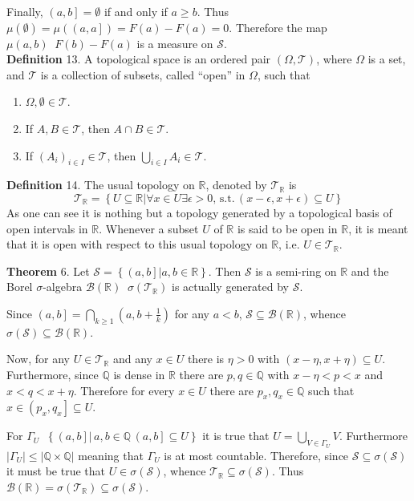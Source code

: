 \documentclass[a4paper]{article}
\newcommand{\obj}[1]{\left\{ #1 \right \}}
\newcommand{\ploc}[1]{\left ( #1 \right ]}
\newcommand{\brac}[1]{\left ( #1 \right )}
\newcommand{\induc}[1]{\left . #1 \right \vert}
\newcommand{\abs}[1]{\left | #1 \right |}
\newcommand{\Real}{\mathbb{R}}
\newcommand{\Tcal}{\mathcal{T}}
\newcommand{\Scal}{\mathcal{S}}
\newcommand{\borel}[1]{\mathcal{B}\brac{#1}}
\newcommand{\defn}{\mathop{\overset{\Delta}{=}}\nolimits}
\begin{document}
Finally, $\ploc{a,b}=\emptyset$ if and only if $a\geq b$. Thus $\mu\brac{\emptyset}=\mu\brac{\ploc{a,a}}=F\brac{a}-F\brac{a}=0$. Therefore the map $\mu\brac{a,b}\defn F\brac{b}-F\brac{a}$ is a measure on $\Scal$.\\

\noindent \textbf{Definition} 13.
A topological space is an ordered pair $\brac{\Omega, \Tcal}$, where $\Omega$ is a set, and $\Tcal$ is a collection of subsets, called ``open'' in $\Omega$, such that \begin{enumerate}
	\item $\Omega, \emptyset \in \Tcal$.
	\item If $A,B\in \Tcal$, then $A\cap B\in \Tcal$.
	\item If $\brac{A_i}_{i\in I}\in \Tcal$, then $\bigcup_{i\in I}A_i \in \Tcal$.
\end{enumerate}

\noindent \textbf{Definition} 14.
The usual topology on $\Real$, denoted by $\Tcal_\Real$ is \[\Tcal_\Real = \obj{\induc{ U\subseteq \Real } \forall x\in U \exists \epsilon > 0,\,\text{s.t.}\,\brac{x-\epsilon,x+\epsilon}\subseteq U}\] As one can see it is nothing but a topology generated by a topological basis of open intervals in $\Real$. Whenever a subset $U$ of $\Real$ is said to be open in $\Real$, it is meant that it is open with respect to this usual topology on $\Real$, i.e. $U\in \Tcal_\Real$.

\label{thm:borel1} \noindent \textbf{Theorem} 6.
Let $\Scal = \obj{\induc{\ploc{a,b}}a,b\in\Real}$. Then $\Scal$ is a semi-ring on $\Real$ and the Borel $\sigma$-algebra $\borel{\Real}\defn\sigma\brac{\Tcal_\Real}$ is actually generated by $\Scal$.

Since $\ploc{a,b}=\bigcap_{k\geq1}\brac{a,b+\frac{1}{k}}$ for any $a<b$, $\Scal\subseteq \borel{\Real}$, whence $\sigma\brac{\Scal}\subseteq \borel{\Real}$.

Now, for any $U\in \Tcal_\Real$ and any $x\in U$ there is $\eta>0$ with $\brac{x-\eta,x+\eta}\subseteq U$. Furthermore, since $\mathbb{Q}$ is dense in $\Real$ there are $p,q\in\mathbb{Q}$ with $x-\eta<p<x$ and $x<q<x+\eta$. Therefore for every $x\in U$ there are $p_x, q_x\in \mathbb{Q}$ such that $x\in\ploc{p_x,q_x}\subseteq U$.

For $\Gamma_U\defn\obj{ \induc{\ploc{a,b}}\,a,b\in\mathbb{Q}\,\ploc{a,b}\subseteq U}$ it is true that $U=\bigcup_{V\in \Gamma_U} V$. Furthermore $\abs{\Gamma_U}\leq \abs{\mathbb{Q}\times \mathbb{Q}}$ meaning that $\Gamma_U$ is at most countable. Therefore, since $\Scal\subseteq \sigma\brac{\Scal}$ it must be true that $U\in \sigma\brac{\Scal}$, whence $\Tcal_\Real\subseteq \sigma\brac{\Scal}$. Thus $\borel{\Real}=\sigma\brac{\Tcal_\Real}\subseteq \sigma\brac{\Scal}$.
\end{document}
